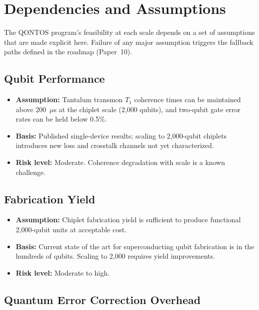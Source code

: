\documentclass[conference]{IEEEtran}
\begin{document}
\section{Dependencies and Assumptions}

The QONTOS program's feasibility at each scale depends on a set of assumptions that are made explicit here. Failure of any major assumption triggers the fallback paths defined in the roadmap (Paper~10).

\subsection{Qubit Performance}

\begin{itemize}
\item \textbf{Assumption:} Tantalum transmon $T_1$ coherence times can be maintained above 200~$\mu$s at the chiplet scale (2,000 qubits), and two-qubit gate error rates can be held below 0.5\%.
\item \textbf{Basis:} Published single-device results; scaling to 2,000-qubit chiplets introduces new loss and crosstalk channels not yet characterized.
\item \textbf{Risk level:} Moderate. Coherence degradation with scale is a known challenge.
\end{itemize}

\subsection{Fabrication Yield}

\begin{itemize}
\item \textbf{Assumption:} Chiplet fabrication yield is sufficient to produce functional 2,000-qubit units at acceptable cost.
\item \textbf{Basis:} Current state of the art for superconducting qubit fabrication is in the hundreds of qubits. Scaling to 2,000 requires yield improvements.
\item \textbf{Risk level:} Moderate to high.
\end{itemize}

\subsection{Quantum Error Correction Overhead}
\end{document}
